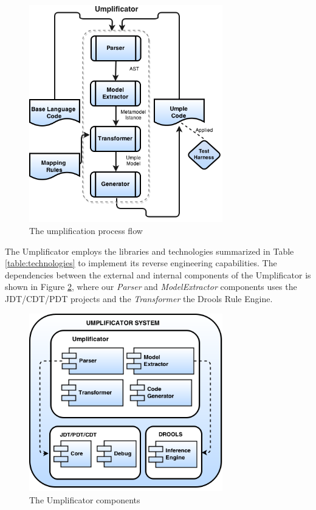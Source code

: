 \begin{figure}[h]
\centering
\includegraphics[width=0.75\textwidth]{Figures/Umplificator_ProcessFlow.png} 
\caption{The umplification process flow}
\label{fig:process_flow}
\end{figure}

The Umplificator employs the libraries and technologies summarized in Table \ref{table:technologies} to implement its reverse engineering capabilities. The dependencies between the external and internal components of the Umplificator is shown in Figure \ref{fig:architecture}, where our \textit{Parser} and \textit{ModelExtractor} components uses the JDT/CDT/PDT projects and the \textit{Transformer} the Drools Rule Engine. 

\begin{figure}[h]
\centering
\includegraphics[width=0.75\textwidth]{Figures/UmplificatorComponents.png} 
\caption{The Umplificator components}
\label{fig:architecture}
\end{figure}

